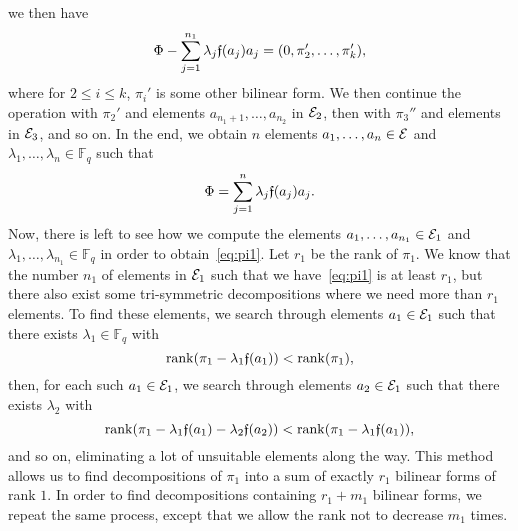 \documentclass[a4paper,11pt]{article}
\begin{document}
we then have
\[
  \Phi-\sum_{j=1}^{n_1}\lambda_j\mathfrak{f}(a_j)a_j = (0, \pi_2', \dots, \pi_k'), 
\]
where for $2\leq i \leq k$, $\pi_i'$ is some other bilinear form.
We then continue the operation with $\pi_2'$ and elements $a_{n_1+1}, \dots,
a_{n_2}$ in $\mathcal{E}_2$, then with $\pi_3''$ and elements in $\mathcal{E}_3$, and so on. In
the end, we obtain $n$ elements $a_1, \dots, a_n\in \mathcal{E}$ and $\lambda_1, \dots,
\lambda_n\in\mathbb{F}_q$ such that
\[
  \Phi = \sum_{j=1}^{n}\lambda_j\mathfrak{f}(a_j)a_j.
\]
Now, there is left to see how we compute the elements $a_1, \dots,
a_{n_1}\in\mathcal{E}_1$ and $\lambda_1, \dots, \lambda_{n_1}\in\mathbb{F}_q$ in order to
obtain~\eqref{eq:pi1}. Let $r_1$ be the rank of $\pi_1$. We know that the number
$n_1$ of elements in $\mathcal{E}_1$ such that we have~\eqref{eq:pi1} is at least $r_1$,
but there also exist some tri-symmetric decompositions where we need more than $r_1$
elements. To find these elements, we search through elements $a_1\in\mathcal{E}_1$ such that
there exists $\lambda_1\in\mathbb{F}_q$ with
\[
  \operatorname{rank}(\pi_1-\lambda_1\mathfrak{f}(a_1))<\operatorname{rank}(\pi_1),
\]
then, for each such $a_1\in\mathcal{E}_1$, we search through elements $a_2\in\mathcal{E}_1$ such that there exists $\lambda_2$
with
\[
  \operatorname{rank}(\pi_1-\lambda_1\mathfrak{f}(a_1)-\lambda_2\mathfrak{f}(a_2))<\operatorname{rank}(\pi_1-\lambda_1\mathfrak{f}(a_1)),
\]
and so on, eliminating a lot of unsuitable elements along the way. This method
allows us to find decompositions of $\pi_1$ into a sum of exactly $r_1$ bilinear forms of
rank $1$. In order to find decompositions containing $r_1+m_1$ bilinear forms, we
repeat the same process, except that we allow the rank not to decrease $m_1$ times.
\end{document}
